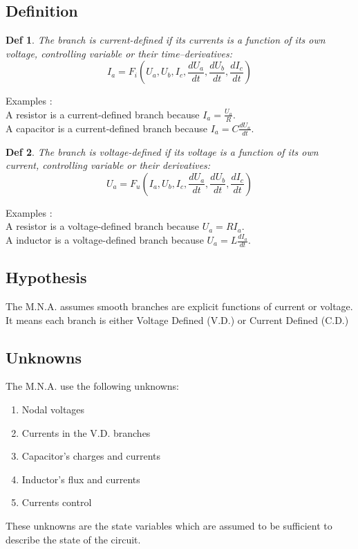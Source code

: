 \subsection{Definition}
\newtheorem{mur}{Def}
\begin{mur}
The branch is current-defined if its currents is a function of its own voltage, controlling variable
or their time--derivatives:
\begin{equation}\label{CD}I_{a}=F_{i}(U_{a},U_{b},I_{c},\frac{dU_a}{dt},\frac{dU_b}{dt},\frac{dI_{c}}{dt})\end{equation}
\end{mur}
Examples : \\
A resistor is a current-defined branch because $I_{a}=\frac{U_{a}}{R}$.\\
A capacitor is a current-defined branch because $I_{a}=C\frac{dU_{a}}{dt}$.\\
\begin{mur}
The branch is voltage-defined if its voltage is a function of its own current, controlling variable
or their derivatives:
\begin{equation}\label{VD}U_{a}=F_{u}(I_{a},U_{b},I_{c},\frac{dU_a}{dt},\frac{dU_b}{dt},\frac{dI_{c}}{dt})\end{equation}
\end{mur}
Examples : \\
A resistor is a voltage-defined branch because $U_{a}=RI_{a}$.\\
A inductor is a voltage-defined branch because $U_{a}=L\frac{dI_{a}}{dt}$.\\
\subsection{Hypothesis}
The M.N.A. assumes smooth branches are explicit functions of current or voltage. It means each branch is either Voltage Defined (V.D.) or Current Defined (C.D.)\\
\subsection{Unknowns}
The M.N.A. use the following unknowns:
\begin{enumerate}
\item Nodal voltages
\item Currents in the V.D. branches
\item Capacitor's charges and currents
\item Inductor's flux and currents
\item Currents control
\end{enumerate}
These unknowns are the state variables which are assumed to be sufficient to describe the state of the circuit.
